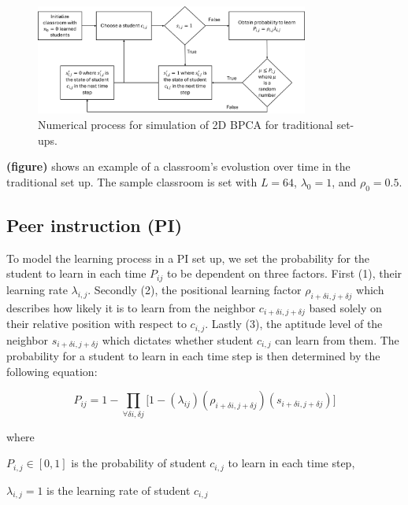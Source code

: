 \begin{figure}[htbp!]
    \centering
    \includegraphics[width=0.8\textwidth]{figures/2DBPCA TI Flowchart.png}
    \caption[Traditional instruction flowchart]{Numerical process for simulation of 2D BPCA for traditional set-ups.}
    \label{fig:2DBPCA Traditional Flowchart}
\end{figure}

\textbf{(figure)} shows an example of a classroom's evolustion over time in the traditional set up. The sample classroom is set with $L=64$, $\lambda_0 = 1$, and $\rho_0 = 0.5$.

\subsection{Peer instruction (PI)}
To model the learning process in a PI set up, we set the probability for the student to learn in each time $P_{ij}$ to be dependent on three factors.
First (1), their learning rate $\lambda_{i,j}$. 
Secondly (2), the positional learning factor $\rho_{i+\delta i, j+\delta j}$ which describes how likely it is to learn from the neighbor $c_{i+\delta i, j+\delta j}$ based solely on their relative position with respect to $c_{i,j}$. 
Lastly (3), the aptitude level of the neighbor $s_{i+\delta i, j+\delta j}$ which dictates whether student $c_{i,j}$ can learn from them. 
The probability for a student to learn in each time step is then determined by the following equation:

\begin{equation}
    \label{eq:BPCA PI learning probability}
        P_{ij} = 1 - \prod_{\forall \delta i, \delta j}{\lbrack1-(\lambda_{ij})(\rho_{i+\delta i, j+\delta j})(s_{i+\delta i, j+\delta j})}\rbrack
\end{equation}

where

$P_{i,j} \in [0,1]$ is the probability of student $c_{i,j}$ to learn in each time step, 

$\lambda_{i,j} = 1$ is the learning rate of student $c_{i,j}$

